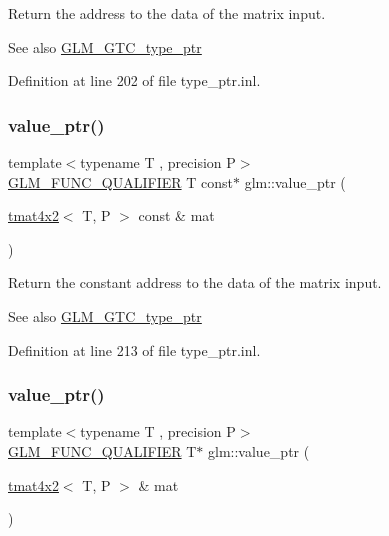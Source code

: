 Return the address to the data of the matrix input. \begin{DoxySeeAlso}{See also}
\mbox{\hyperlink{group__gtc__type__ptr}{G\+L\+M\+\_\+\+G\+T\+C\+\_\+type\+\_\+ptr}} 
\end{DoxySeeAlso}


Definition at line 202 of file type\+\_\+ptr.\+inl.

\mbox{\label{group__gtc__type__ptr_ga1de002422f32c6da9d65d3f257f37196}} 
\subsubsection{\texorpdfstring{value\_ptr()}{value\_ptr()}\hspace{0.1cm}{\footnotesize\ttfamily [20/27]}}
{\footnotesize\ttfamily template$<$typename T , precision P$>$ \\
\mbox{\hyperlink{setup_8hpp_a33fdea6f91c5f834105f7415e2a64407}{G\+L\+M\+\_\+\+F\+U\+N\+C\+\_\+\+Q\+U\+A\+L\+I\+F\+I\+ER}} T const$\ast$ glm\+::value\+\_\+ptr (\begin{DoxyParamCaption}\item[{\mbox{\hyperlink{structglm_1_1tmat4x2}{tmat4x2}}$<$ T, P $>$ const \&}]{mat }\end{DoxyParamCaption})}

Return the constant address to the data of the matrix input. \begin{DoxySeeAlso}{See also}
\mbox{\hyperlink{group__gtc__type__ptr}{G\+L\+M\+\_\+\+G\+T\+C\+\_\+type\+\_\+ptr}} 
\end{DoxySeeAlso}


Definition at line 213 of file type\+\_\+ptr.\+inl.

\mbox{\label{group__gtc__type__ptr_ga0e62660f9066864568cd74d76d528a6e}} 
\subsubsection{\texorpdfstring{value\_ptr()}{value\_ptr()}\hspace{0.1cm}{\footnotesize\ttfamily [21/27]}}
{\footnotesize\ttfamily template$<$typename T , precision P$>$ \\
\mbox{\hyperlink{setup_8hpp_a33fdea6f91c5f834105f7415e2a64407}{G\+L\+M\+\_\+\+F\+U\+N\+C\+\_\+\+Q\+U\+A\+L\+I\+F\+I\+ER}} T$\ast$ glm\+::value\+\_\+ptr (\begin{DoxyParamCaption}\item[{\mbox{\hyperlink{structglm_1_1tmat4x2}{tmat4x2}}$<$ T, P $>$ \&}]{mat }\end{DoxyParamCaption})}

